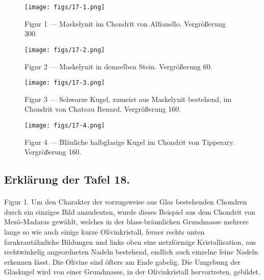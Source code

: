 \documentclass[a4paper, 12pt, oneside]{article}
\begin{document}
\vspace*{\fill}
\begin{figure}[H]
\centering
\texttt{[image: figs/17-1.png]}
\caption{\small Figur 1 --- Maskelynit im Chondrit von Alfianello. Vergrößerung 300.}
\end{figure}
\vspace*{\fill}
\clearpage

\vspace*{\fill}
\begin{figure}[H]
\centering
\texttt{[image: figs/17-2.png]}
\caption{\small Figur 2 --- Maskelynit in demselben Stein. Vergrößerung 60.}
\end{figure}
\vspace*{\fill}
\clearpage

\vspace*{\fill}
\begin{figure}[H]
\centering
\texttt{[image: figs/17-3.png]}
\caption{\small Figur 3 --- Schwarze Kugel, zumeist aus Maskelynit bestehend, im Chondrit von Chateau Renard. Vergrößerung 160.}
\end{figure}
\vspace*{\fill}
\clearpage

\vspace*{\fill}
\begin{figure}[H]
\centering
\texttt{[image: figs/17-4.png]}
\caption{\small Figur 4 --- Bläuliche halbglasige Kugel im Chondrit von Tipperary. Vergrößerung 160.}
\end{figure}
\vspace*{\fill}
\clearpage

\subsection{Erklärung der Tafel 18.}
\paragraph{}
Figur 1. Um den Charakter der vorzugsweise aus Glas bestehenden Chondren durch ein einziges Bild anzudeuten, wurde dieses Beispiel aus dem Chondrit von Mezö-Madaras gewählt, welches in der blass-bräunlichen Grundmasse mehrere lange so wie auch einige kurze Olivinkristall, ferner rechts unten farnkrautähnliche Bildungen und links oben eine netzförmige Kristallisation, aus rechtwinkelig angeordneten Nadeln bestehend, endlich auch einzelne feine Nadeln erkennen lässt. Die Olivine sind öfters am Ende gabelig. Die Umgebung der Glaskugel wird von einer Grundmasse, in der Olivinkristall hervortreten, gebildet.
\end{document}
